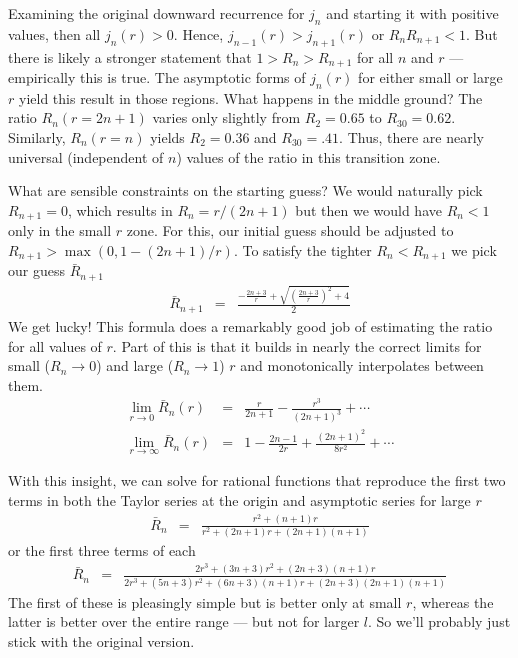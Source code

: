 \documentclass[12pt]{article}
\begin{document}
Examining the original downward recurrence for $j_n$ and starting it with positive values, then all $j_n(r)>0$.  Hence, $j_{n-1}(r) > j_{n+1}(r)$ or $R_n R_{n+1} < 1$.  But there is likely a stronger statement that $1 > R_n > R_{n+1}$ for all $n$ and $r$ --- empirically this is true.  The asymptotic forms of $j_n(r)$ for either small or large $r$ yield this result in those regions.  What happens in the middle ground? The ratio $R_n(r=2n+1)$ varies only slightly from $R_2=0.65$ to $R_{30}=0.62$.  Similarly, $R_n(r=n)$ yields $R_2=0.36$ and $R_{30}=.41$.  Thus, there are nearly universal (independent of $n$) values of the ratio in this transition zone.

What are sensible constraints on the starting guess?  We would naturally pick $R_{n+1}=0$, which results in $R_n = r/(2n+1)$ but then we would have $R_n < 1$ only in the small $r$ zone.  For this, our initial guess should be adjusted to $R_{n+1} > \max (0,1 - (2n+1)/r)$.  To satisfy the tighter $R_n < R_{n+1}$ we pick our guess $\bar{R}_{n+1}$
\begin{eqnarray}
  \bar{R}_{n+1} & = & \frac{-\frac{2n+3}{r} + \sqrt{\left(\frac{2n+3}{r}\right)^2 + 4}}{2}
\end{eqnarray}
We get lucky!  This formula does a remarkably good job of estimating the ratio for all values of $r$. Part of this is that it builds in nearly the correct limits for small ($R_n \rightarrow 0$) and large ($R_n \rightarrow 1$) $r$ and monotonically interpolates between them.
\begin{eqnarray}
  \lim_{r \rightarrow 0} \bar{R}_{n}(r) & = & \frac{r}{2 n + 1} - \frac{r^3}{(2n + 1)^3} + \cdots \\
  \lim_{r \rightarrow \infty} \bar{R}_{n}(r) & = & 1 - \frac{2n - 1}{2r} + \frac{(2n + 1)^2}{8 r^2} + \cdots
\end{eqnarray}

With this insight, we can solve for rational functions that reproduce the first two terms in both the Taylor series at the origin and asymptotic series for large $r$
\begin{eqnarray}
  \bar{R}_n & = & \frac{r^2 + (n + 1)r}{r^2 + (2 n + 1) r + (2 n + 1) (n + 1)}
\end{eqnarray}
or the first three terms of each
\begin{eqnarray}
  \bar{R}_{n} & = & \frac{2 r^{3}+\left(3 n +3\right) r^{2}+\left(2 n +3\right) \left(n +1\right) r}{2 r^{3}+\left(5 n +3\right) r^{2}+\left(6 n +3\right) \left(n +1\right) r +\left(2 n +3\right) \left(2 n +1\right) \left(n +1\right)}
\end{eqnarray}
The first of these is pleasingly simple but is better only at small $r$, whereas the latter is better over the entire range --- but not for larger $l$.  So we'll probably just stick with the original version.
\end{document}

